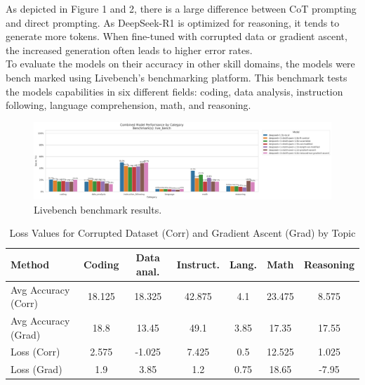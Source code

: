 \documentclass[10.5pt]{article}
\begin{document}
As depicted in Figure 1 and 2, there is a large difference between CoT prompting and direct prompting. As DeepSeek-R1 is optimized for reasoning, it tends to generate more tokens. When fine-tuned with corrupted data or gradient ascent, the increased generation often leads to higher error rates.
\\
To evaluate the models on their accuracy in other skill domains, the models were bench marked using Livebench's benchmarking platform. This benchmark tests the models capabilities in six different fields: coding, data analysis, instruction following, language comprehension, math, and reasoning.
\begin{figure}[h]
    \centering
    \includegraphics[width=0.9\linewidth]{combined_group_scores_live_bench.png}
    \caption{Livebench benchmark results.}
    \label{fig:bench_and_direct}
\end{figure}
\begin{table}[h]
\centering
\tiny
\caption{Loss Values for Corrupted Dataset (Corr) and Gradient Ascent (Grad) by Topic}
\label{tab:loss}
\setlength{\tabcolsep}{3.5pt}
\begin{tabular}{|l|c|c|c|c|c|c|}
\hline
\textbf{Method} & \textbf{Coding} & \textbf{Data anal.} & \textbf{Instruct.} & \textbf{Lang.} & \textbf{Math} & \textbf{Reasoning} \\ \hline
Avg Accuracy (Corr) & 18.125 & 18.325 & 42.875 & 4.1 & 23.475 & 8.575 \\ \hline
Avg Accuracy (Grad) & 18.8 & 13.45 & 49.1 & 3.85 & 17.35 & 17.55 \\ \hline
Loss (Corr) & 2.575 & -1.025 & 7.425 & 0.5 & 12.525 & 1.025  \\ \hline
Loss (Grad) & 1.9 & 3.85 & 1.2 & 0.75 & 18.65 & -7.95  \\ \hline
\end{tabular}
\end{table}
\end{document}
